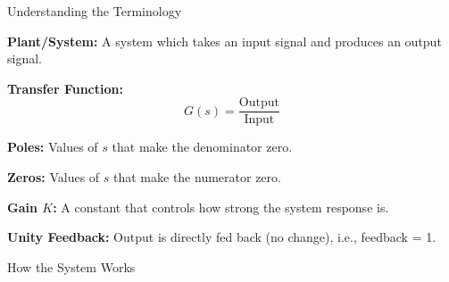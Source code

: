 \documentclass{beamer}
\begin{document}


\begin{frame}{Understanding the Terminology}

\textbf{Plant/System:} A system which takes an input signal and produces an output signal.

\vspace{0.2cm}

\textbf{Transfer Function:}
\begin{equation}
G(s) = \frac{\text{Output}}{\text{Input}}
\end{equation}


\vspace{0.2cm}

\textbf{Poles:} Values of $s$ that make the denominator zero.

\textbf{Zeros:} Values of $s$ that make the numerator zero.

\vspace{0.2cm}

\textbf{Gain $K$:} A constant that controls how strong the system response is.

\vspace{0.2cm}

\textbf{Unity Feedback:} Output is directly fed back (no change), i.e., feedback = 1.

\end{frame}





\begin{frame}{How the System Works}

\begin{center}
\end{center}

\end{frame}
\end{document}
